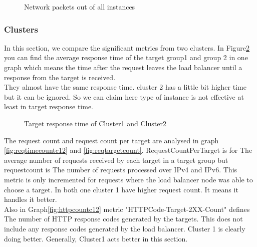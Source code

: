 \documentclass[12pt]{article}
\begin{document}
    \begin{figure}[htpb]
        \centering
            \caption{Network packets out of all instances}
            \label{fig:netout}
        \end{figure}


        
        \subsubsection{Clusters}
            In this section, we compare the significant metrics from two clusters. In Figure\ref{fig:targerresponsetimec12} you can find the average response time of the target group1 and group 2 in one graph which means the time after the request leaves the load balancer until a response from the target is received.\\
            They almost have the same response time. cluster 2 has a little bit higher time but it can be ignored. So we can claim here type of instance is not effective at least in target response time.\\
          
                \begin{figure}[htpb]
                \centering
                    \caption{Target response time of Cluster1 and Cluster2}
                    \label{fig:targerresponsetimec12}
                \end{figure}


                The request count and request count per target are analysed in graph \ref{fig:reqtimecountc12} and \ref{fig:reqtargetcount}. RequestCountPerTarget is for The average number of requests received by each target in a target group but requestcount is The number of requests processed over IPv4 and IPv6. This metric is only incremented for requests where the load balancer node was able to choose a target. In both one cluster 1 have higher request count. It means it handles it better.\\
                Also in Graph\ref{fig:httpcountc12} metric "HTTPCode-Target-2XX-Count" defines The number of HTTP response codes generated by the targets. This does not include any response codes generated by the load balancer. Cluster 1 is clearly doing better. Generally, Cluster1 acts better in this section.
\end{document}
